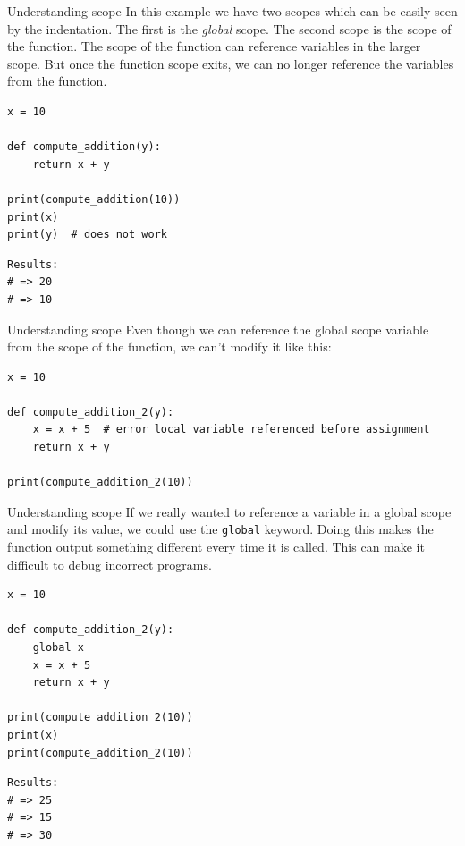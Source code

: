 \documentclass[10pt]{beamer}
\begin{document}
\begin{frame}[label={sec:org714c429},fragile]{Understanding scope}
 In this example we have two scopes which can be easily seen by the indentation. The
first is the \emph{global} scope. The second scope is the scope of the function. The scope
of the function can reference variables in the larger scope. But once the function
scope exits, we can no longer reference the variables from the function.

\begin{verbatim}
x = 10

def compute_addition(y):
    return x + y

print(compute_addition(10))
print(x)
print(y)  # does not work
\end{verbatim}

\begin{verbatim}
Results: 
# => 20
# => 10
\end{verbatim}
\end{frame}

\begin{frame}[label={sec:org823ea89},fragile]{Understanding scope}
 Even though we can reference the global scope variable from the scope of the
function, we can't modify it like this:

\begin{verbatim}
x = 10

def compute_addition_2(y):
    x = x + 5  # error local variable referenced before assignment
    return x + y

print(compute_addition_2(10))
\end{verbatim}
\end{frame}

\begin{frame}[label={sec:org6b57050},fragile]{Understanding scope}
 If we really wanted to reference a variable in a global scope and modify its value,
we could use the \texttt{global} keyword. Doing this makes the
function output something different every time it is called. This can make it
difficult to debug incorrect programs.

\begin{verbatim}
x = 10

def compute_addition_2(y):
    global x
    x = x + 5
    return x + y

print(compute_addition_2(10))
print(x)
print(compute_addition_2(10))
\end{verbatim}

\begin{verbatim}
Results: 
# => 25
# => 15
# => 30
\end{verbatim}
\end{frame}
\end{document}
